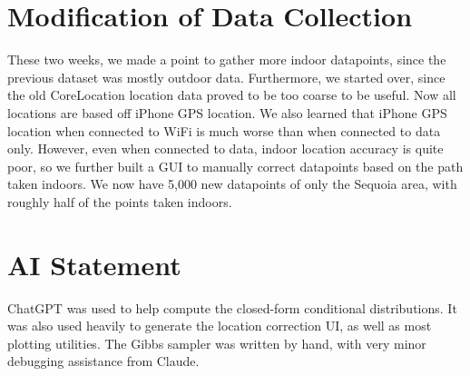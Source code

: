\documentclass{article}
\begin{document}
\section{Modification of Data Collection}

These two weeks, we made a point to gather more indoor datapoints, since the previous dataset was mostly outdoor data. Furthermore, we started over, since the old CoreLocation location data proved to be too coarse to be useful. Now all locations are based off iPhone GPS location. We also learned that iPhone GPS location when connected to WiFi is much worse than when connected to data only. However, even when connected to data, indoor location accuracy is quite poor, so we further built a GUI to manually correct datapoints based on the path taken indoors. We now have 5,000 new datapoints of only the Sequoia area, with roughly half of the points taken indoors. 

\section{AI Statement}
ChatGPT was used to help compute the closed-form conditional distributions. It was also used heavily to generate the location correction UI, as well as most plotting utilities. The Gibbs sampler was written by hand, with very minor debugging assistance from Claude.
\end{document}
